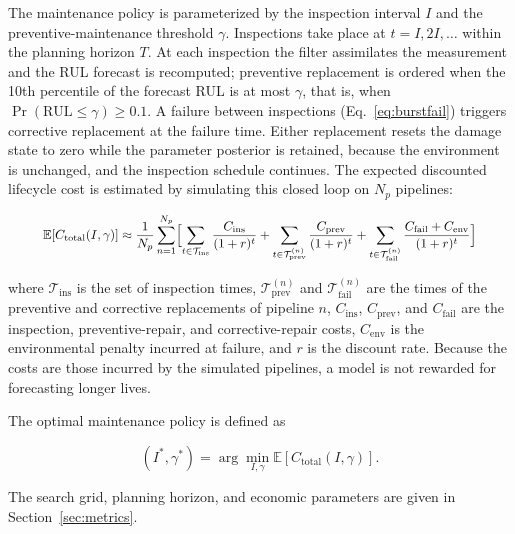 \documentclass[journal]{IEEEtran}
\begin{document}
The maintenance policy is parameterized by the inspection interval $I$
and the preventive-maintenance threshold $\gamma$. Inspections take
place at $t=I,2I,\dots$ within the planning horizon $T$. At each
inspection the filter assimilates the measurement and the RUL forecast
is recomputed; preventive replacement is ordered when the 10th
percentile of the forecast RUL is at most $\gamma$, that is, when
$\Pr(\mathrm{RUL}\le\gamma)\ge0.1$. A failure between inspections
(Eq.~\eqref{eq:burstfail}) triggers corrective replacement at the
failure time. Either replacement resets the damage state to zero while
the parameter posterior is retained, because the environment is
unchanged, and the inspection schedule continues. The expected
discounted lifecycle cost is estimated by simulating this closed loop
on $N_p$ pipelines:

\begin{equation}
\resizebox{0.90\linewidth}{!}{$\displaystyle
\mathbb{E}[C_{\mathrm{total}}(I,\gamma)]
\approx
\frac{1}{N_p}
\sum_{n=1}^{N_p}
\Bigl[
\sum_{t\in\mathcal{T}_{\mathrm{ins}}}\frac{C_{\mathrm{ins}}}{(1+r)^{t}}
+
\sum_{t\in\mathcal{T}^{(n)}_{\mathrm{prev}}}\frac{C_{\mathrm{prev}}}{(1+r)^{t}}
+
\sum_{t\in\mathcal{T}^{(n)}_{\mathrm{fail}}}\frac{C_{\mathrm{fail}}+C_{\mathrm{env}}}{(1+r)^{t}}
\Bigr]$}
\label{eq:cost}
\end{equation}

where $\mathcal{T}_{\mathrm{ins}}$ is the set of inspection times,
$\mathcal{T}^{(n)}_{\mathrm{prev}}$ and $\mathcal{T}^{(n)}_{\mathrm{fail}}$
are the times of the preventive and corrective replacements of pipeline
$n$, $C_{\mathrm{ins}}$, $C_{\mathrm{prev}}$, and $C_{\mathrm{fail}}$ are
the inspection, preventive-repair, and corrective-repair costs,
$C_{\mathrm{env}}$ is the environmental penalty incurred at failure, and
$r$ is the discount rate. Because the costs are those incurred by the
simulated pipelines, a model is not rewarded for forecasting longer
lives.

The optimal maintenance policy is defined as

\begin{equation}
(I^*,\gamma^*)
=
\arg\min_{I,\gamma}
\mathbb{E}
[C_{\mathrm{total}}(I,\gamma)].
\label{eq:opt}
\end{equation}

The search grid, planning horizon, and economic parameters are given in
Section~\ref{sec:metrics}.

\end{document}
